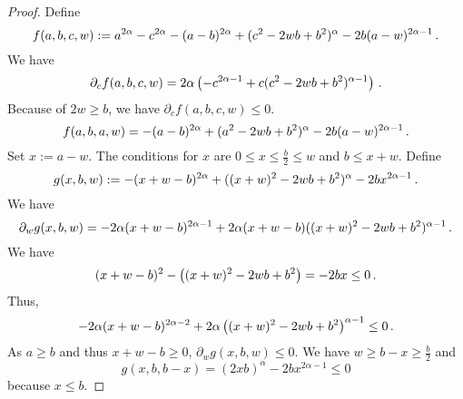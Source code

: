 %
\begin{proof}
	Define
	\begin{equation*}
		f(a,b,c,w) := a^{2\alpha}-c^{2\alpha}-(a-b)^{2\alpha}+(c^2 - 2 w b + b^2)^\alpha 
			- 2 b (a-w)^{2\alpha-1}
			\, .
	\end{equation*} 
	We have
	\begin{equation*}
		\partial_c f(a,b,c,w) =2\alpha\left( -c^{2\alpha-1}+c(c^2 - 2 w b + b^2)^{\alpha-1} \right)
		\, .
	\end{equation*} 
	Because of $2w \geq b$, we have $\partial_c f(a,b,c,w) \leq 0$.
	\begin{equation*}
		f(a,b,a,w) = -(a-b)^{2\alpha}+(a^2 - 2 w b + b^2)^\alpha - 2 b (a-w)^{2\alpha-1}
		\, .
	\end{equation*}
	Set $x := a-w$.
	The conditions for $x$ are $0 \leq x \leq \frac b2 \leq w$ and $b \leq x+w$. Define
	\begin{equation*}
		g(x,b,w) := -(x+w-b)^{2\alpha}+((x+w)^2 - 2 w b + b^2)^\alpha - 2 b x^{2\alpha-1}
		\, .
	\end{equation*}
	We have
	\begin{equation*}
		\partial_w g(x,b,w) =-2\alpha(x+w-b)^{2\alpha-1}+2\alpha(x+w-b)((x+w)^2 - 2 w b + b^2)^{\alpha-1} 
		\, .
	\end{equation*}
	We have
	\begin{equation*}
		(x+w-b)^2 - \left( (x+w)^2 - 2 w b + b^2 \right) = -2 b x \leq 0
		\, .
	\end{equation*}
	Thus,
	\begin{equation*}
		-2\alpha(x+w-b)^{2\alpha-2} + 2\alpha\left( (x+w)^2 - 2 w b + b^2 \right)^{\alpha-1} \leq 0
		\, .
	\end{equation*}
	As $a \geq b$ and thus $x+w-b \geq 0$, $\partial_w g(x,b,w) \leq 0$.
	We have $w \geq b-x \geq \frac b2$ and 
	\begin{equation*}
		g(x,b,b-x)
		=
		(2 x b)^\alpha - 2 b x^{2\alpha-1}
		\leq 0
	\end{equation*}
	because $x\leq b$.
\end{proof}
%
%
%
%
